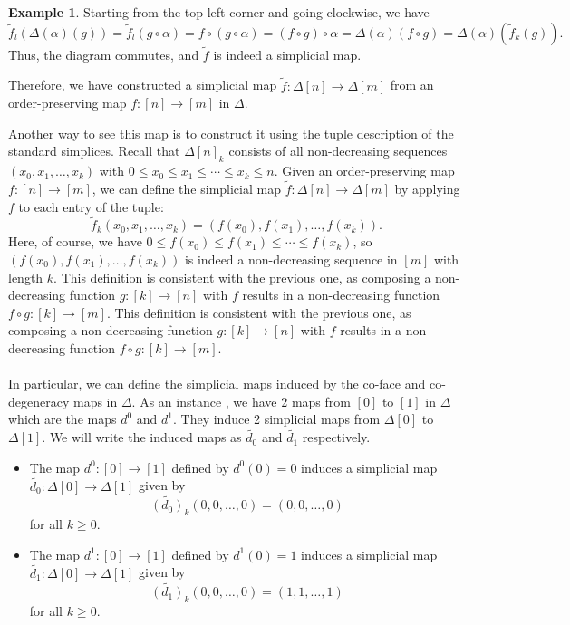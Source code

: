 \documentclass[11pt]{article}
\theoremstyle{definition}
\newtheorem{example}[definition]{Example}
\theoremstyle{plain}
\begin{document}
\begin{example}
    Starting from the top left corner and going clockwise, we have
    \[
        \tilde{f}_l(\Delta(\alpha)(g)) = \tilde{f}_l(g \circ \alpha) = f \circ (g \circ \alpha) = (f \circ g) \circ \alpha = \Delta(\alpha)(f \circ g) = \Delta(\alpha)(\tilde{f}_k(g)).
    \]
    Thus, the diagram commutes, and $\tilde{f}$ is indeed a simplicial map.

    Therefore, we have constructed a simplicial map $\tilde{f} : \Delta[n] \to \Delta[m]$ from an order-preserving map $f : [n] \to [m]$ in $\Delta$.

    Another way to see this map is to construct it using the tuple description of the standard simplices. Recall that $\Delta[n]_k$ consists of all non-decreasing sequences $(x_0, x_1, \ldots, x_k)$ with $0 \leq x_0 \leq x_1 \leq \cdots \leq x_k \leq n$. Given an order-preserving map $f : [n] \to [m]$, we can define the simplicial map $\tilde{f} : \Delta[n] \to \Delta[m]$ by applying $f$ to each entry of the tuple:
    \[
        \tilde{f}_k(x_0, x_1, \ldots, x_k) = (f(x_0), f(x_1), \ldots, f(x_k)).
    \]
    Here, of course, we have $0 \leq f(x_0) \leq f(x_1) \leq \cdots \leq f(x_k)$, so $(f(x_0), f(x_1), \ldots, f(x_k))$ is indeed a non-decreasing sequence in $[m]$ with length $k$. This definition is consistent with the previous one, as composing a non-decreasing function $g : [k] \to [n]$ with $f$ results in a non-decreasing function $f \circ g : [k] \to [m]$.
    This definition is consistent with the previous one, as composing a non-decreasing function $g : [k] \to [n]$ with $f$ results in a non-decreasing function $f \circ g : [k] \to [m]$.

    \paragraph{}In particular, we can define the simplicial maps induced by the co-face and co-degeneracy maps in $\Delta$. As an instance , we have 2 maps from $[0]$ to $[1]$ in $\Delta$ which are the maps $d^0$ and $d^1$. They induce 2 simplicial maps from $\Delta[0]$ to $\Delta[1]$. We will write the induced maps as $\tilde{d_0}$ and $\tilde{d_1}$ respectively.
    \begin{itemize}
        \item The map $d^0 : [0] \to [1]$ defined by $d^0(0)=0$ induces a simplicial map $\tilde{d_0} : \Delta[0] \to \Delta[1]$ given by
              \[
                  \tilde{(d_0)}_k(0,0,\dots,0) = (0,0,\dots,0)
              \]
              for all $k \geq 0$.
        \item The map $d^1 : [0] \to [1]$ defined by $d^1(0)=1$ induces a simplicial map $\tilde{d_1} : \Delta[0] \to \Delta[1]$ given by
              \[
                  \tilde{(d_1)}_k(0,0,\dots,0) = (1,1,\dots,1)
              \]
              for all $k \geq 0$.
    \end{itemize}

\end{example}
\end{document}
